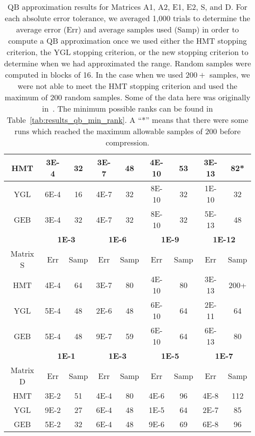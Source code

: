 \begin{table}
\begin{center}
\begin{tabular}{|c|c|c|c|c|c|c|c|c|}
\hline
HMT & 3E-4 & 32 & 3E-7 & 48 & 4E-10 & 53 & 3E-13 & 82* \\
\hline
YGL & 6E-4 & 16 & 4E-7 & 32 & 8E-10 & 32 & 1E-10 & 32 \\
\hline
GEB & 3E-4 & 32 & 4E-7 & 32 & 8E-10 & 32 & 5E-13 & 48 \\
\hline
\hline
\multicolumn{1}{c|}{} &
\multicolumn{2}{|c|}{\textbf{1E-3}} & \multicolumn{2}{|c|}{\textbf{1E-6}} &
\multicolumn{2}{|c|}{\textbf{1E-9}} & \multicolumn{2}{|c|}{\textbf{1E-12}} \\
\hline
Matrix S &
Err & Samp & Err & Samp &
Err & Samp & Err & Samp \\
\hline
HMT & 4E-4 & 64 & 3E-7 & 80 & 4E-10 & 80 & 3E-13 & 200+ \\
\hline
YGL & 5E-4 & 48 & 2E-6 & 48 & 6E-10 & 64 & 2E-11 & 64 \\
\hline
GEB & 5E-4 & 48 & 9E-7 & 59 & 6E-10 & 64 & 6E-13 & 80 \\
\hline
\hline
\multicolumn{1}{c|}{} &
\multicolumn{2}{|c|}{\textbf{1E-1}} & \multicolumn{2}{|c|}{\textbf{1E-3}} &
\multicolumn{2}{|c|}{\textbf{1E-5}} & \multicolumn{2}{|c|}{\textbf{1E-7}} \\
\hline
Matrix D &
Err & Samp & Err & Samp &
Err & Samp & Err & Samp \\
\hline
HMT & 3E-2 & 51 & 4E-4 & 80 & 4E-6 & 96 & 4E-8 & 112 \\
\hline
YGL & 9E-2 & 27 & 6E-4 & 48 & 1E-5 & 64 & 2E-7 & 85 \\
\hline
GEB & 5E-2 & 32 & 6E-4 & 48 & 9E-6 & 69 & 6E-8 & 96 \\
\hline
\end{tabular}
\end{center}
\caption[QB Adaptive Approximation Results]{
QB approximation results for Matrices A1, A2, E1, E2, S, and D.
For each absolute error tolerance, we averaged 1,000 trials to determine
the average error (Err) and average samples used (Samp) in order to compute
a QB approximation once we used either the HMT stopping criterion,
the YGL stopping criterion, or the new stopping criterion to
determine when we had approximated the range.
Random samples were computed in blocks of 16.
In the case when we used $200+$ samples,
we were not able to meet the HMT stopping criterion
and used the maximum of 200 random samples.
Some of the data here was originally in~\cite{randomHSSLBL}.
The minimum possible ranks can be found in Table~\ref{tab:results_qb_min_rank}.
A ``*'' means that there were some runs which reached the maximum allowable
samples of 200 before compression.
}
\label{tab:results_qb_approx_mat}
\end{table}
